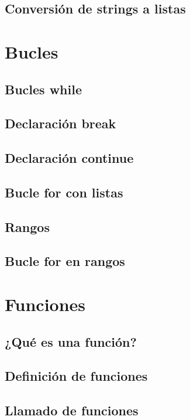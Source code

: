 \documentclass{article}
\begin{document}
\subsection{Conversión de strings a listas}

\section{Bucles}

\subsection{Bucles while}

\subsection{Declaración break}

\subsection{Declaración continue}

\subsection{Bucle for con listas}

\subsection{Rangos}

\subsection{Bucle for en rangos}

\section{Funciones}

\subsection{¿Qué es una función?}

\subsection{Definición de funciones}

\subsection{Llamado de funciones}
\end{document}
